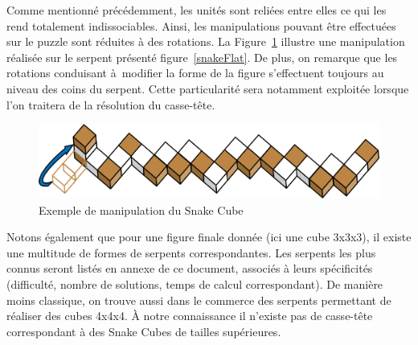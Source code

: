 \newpage Comme mentionné précédemment, les unités sont reliées entre elles ce qui les rend totalement indissociables. Ainsi, les manipulations pouvant être effectuées sur le puzzle sont réduites à des rotations. La Figure~\ref{snakeMove} illustre une manipulation réalisée sur le serpent présenté figure~\ref{snakeFlat}. De plus, on remarque que les rotations conduisant à modifier la forme de la figure s’effectuent toujours au niveau des coins du serpent. Cette particularité sera notamment exploitée lorsque l’on traitera de la résolution du casse-tête.

\begin{figure}[h]
 \centering
 \includegraphics[scale=0.3,keepaspectratio=true]{img/snakeCubeMove.png}
 \caption{Exemple de manipulation du Snake Cube}
 \label{snakeMove}
\end{figure}

Notons également  que pour une figure finale donnée (ici une cube 3x3x3), il existe une multitude de formes de serpents correspondantes. Les serpents les plus connus seront listés en annexe de ce document, associés à leurs spécificités (difficulté, nombre de solutions, temps de calcul correspondant). De manière moins classique, on trouve aussi dans le commerce des serpents permettant de réaliser des cubes 4x4x4. À notre connaissance il n’existe pas de casse-tête correspondant à des Snake Cubes de tailles supérieures.